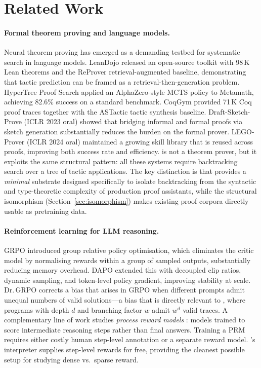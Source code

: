 \section{Related Work}
\label{sec:related}

\paragraph{Formal theorem proving and language models.}
Neural theorem proving has emerged as a demanding testbed for systematic search
in language models.
LeanDojo \citep{yang2023leandojo} released an open-source toolkit with 98\,K
Lean theorems and the ReProver retrieval-augmented baseline, demonstrating that
tactic prediction can be framed as a retrieval-then-generation problem.
HyperTree Proof Search \citep{lample2022hypertree} applied an AlphaZero-style
MCTS policy to Metamath, achieving 82.6\% success on a standard benchmark.
CoqGym \citep{yang2019coqgym} provided 71\,K Coq proof traces together with the
ASTactic tactic synthesis baseline.
Draft-Sketch-Prove \citep{jiang2023dsp} (ICLR 2023 oral) showed that bridging
informal and formal proofs via sketch generation substantially reduces the
burden on the formal prover.
LEGO-Prover \citep{wang2024legoprover} (ICLR 2024 oral) maintained a growing
skill library that is reused across proofs, improving both success rate and
efficiency.
\gore{} is not a theorem prover, but it exploits the same structural pattern:
all these systems require backtracking search over a tree of tactic applications.
The key distinction is that \gore{} provides a \emph{minimal} substrate
designed specifically to isolate backtracking from the syntactic and
type-theoretic complexity of production proof assistants, while the structural
isomorphism (Section~\ref{sec:isomorphism}) makes existing proof corpora
directly usable as pretraining data.

\paragraph{Reinforcement learning for LLM reasoning.}
GRPO \citep{shao2024deepseekmath} introduced group relative policy optimisation,
which eliminates the critic model by normalising rewards within a group of
sampled outputs, substantially reducing memory overhead.
DAPO \citep{yu2025dapo} extended this with decoupled clip ratios, dynamic
sampling, and token-level policy gradient, improving stability at scale.
Dr.\,GRPO corrects a bias that arises in GRPO when different prompts admit
unequal numbers of valid solutions---a bias that is directly relevant to
\gore{}, where programs with depth $d$ and branching factor $w$ admit $w^d$
valid traces.
A complementary line of work studies \emph{process reward models}
\citep{lightman2023lets}: models trained to score intermediate reasoning steps
rather than final answers.
Training a PRM requires either costly human step-level annotation or a separate
reward model.
\gore{}'s interpreter supplies step-level rewards for free, providing the
cleanest possible setup for studying dense vs.\ sparse reward.

